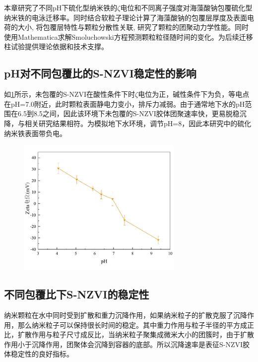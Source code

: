 
本章研究了不同pH下硫化型纳米铁的$\zeta$电位和不同离子强度对海藻酸钠包覆硫化型纳米铁的电泳迁移率。同时结合软粒子理论计算了海藻酸钠的包覆层厚度及表面电荷的大小, 将包覆层特性与颗粒分散性关联, 研究了颗粒的团聚动力学性能。同时使用Mathematica求解Smoluchowski方程预测颗粒粒径随时间的变化。为后续迁移柱试验提供理论依据和技术支撑。


\subsection{pH对不同包覆比的S-NZVI稳定性的影响}

如\cref{fig3}所示，未包覆的S-NZVI在酸性条件下时$\zeta$电位为正，碱性条件下为负，等电点在pH=7.0附近，此时颗粒表面静电力变小，排斥力减弱。由于通常地下水的pH范围在6.5到8.5之间\cite{dixiashuibiaozhun}，因此该环境下未包覆的S-NZVI胶体团聚速率快，更易脱稳沉降，与相关研究结果相符。为模拟地下水环境，调节pH=8，因此本研究中的硫化纳米铁表面带负电。

\begin{figure}[htb]
    \centering
    \includegraphics[width=8cm]{figs/fig3.pdf}
    \label{fig3}
\end{figure}

\subsection{不同包覆比下S-NZVI的稳定性}

纳米颗粒在水中同时受到扩散和重力沉降作用，如果纳米粒子的扩散克服了沉降作用，那么纳米粒子可以保持很长时间的稳定。其中重力作用与粒子半径的平方成正比，扩散作用与粒子尺寸成反比，当纳米粒子聚集成微米大小的团簇时，由于扩散作用小于沉降作用，团聚体会沉降到容器的底部。所以沉降速率是表征S-NZVI胶体稳定性的良好指标。


